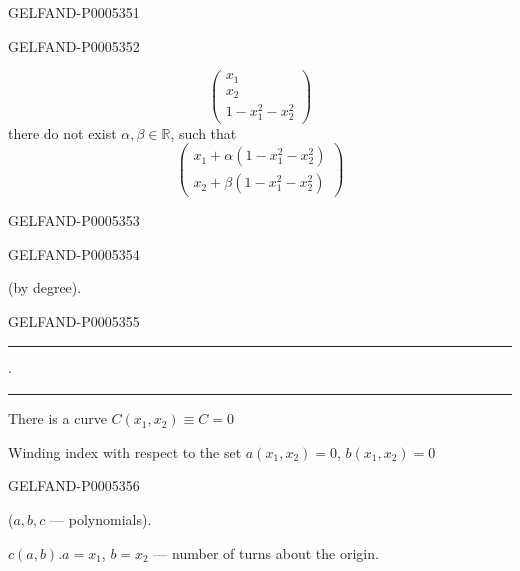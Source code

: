 \begin{GelfandAdjacentEvidence}{GELFAND-P000535}{1}
\end{GelfandAdjacentEvidence}
\begin{GelfandAdjacentEvidence}{GELFAND-P000535}{2}

\[
\begin{pmatrix}x_1\\x_2\\1-x_1^2-x_2^2\end{pmatrix}
\]
there do not exist $\alpha,\beta\in\mathbb R$, such that
\[
\begin{pmatrix}
x_1+\alpha(1-x_1^2-x_2^2)\\
x_2+\beta(1-x_1^2-x_2^2)
\end{pmatrix}
\]
\end{GelfandAdjacentEvidence}
\begin{GelfandAdjacentEvidence}{GELFAND-P000535}{3}

\end{GelfandAdjacentEvidence}
\begin{GelfandAdjacentEvidence}{GELFAND-P000535}{4}

(by degree).
\end{GelfandAdjacentEvidence}
\begin{GelfandAdjacentEvidence}{GELFAND-P000535}{5}


\hfill\rule{.8cm}{.35pt}\enspace\(\cdot\)\enspace\rule{1.5cm}{.35pt}\par

There is a curve $C(x_1,x_2)\equiv C=0$

Winding index with respect to the set $a(x_1,x_2)=0$, $b(x_1,x_2)=0$
\end{GelfandAdjacentEvidence}
\begin{GelfandAdjacentEvidence}{GELFAND-P000535}{6}

($a,b,c$ — polynomials).

$c(a,b)$.\qquad $a=x_1$, $b=x_2$ — number of turns about the origin.
\end{GelfandAdjacentEvidence}
